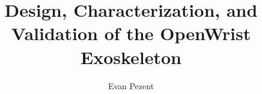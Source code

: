 \documentclass[12pt]{ruthesis}
\title{Design, Characterization, and Validation of the OpenWrist Exoskeleton}
\author{Evan Pezent}
\begin{document}
  
  \begin{frontmatter}
   
   
   \tableofcontents
   \listoffigures
   \listoftables
  \end{frontmatter}








\appendix




\end{document}
